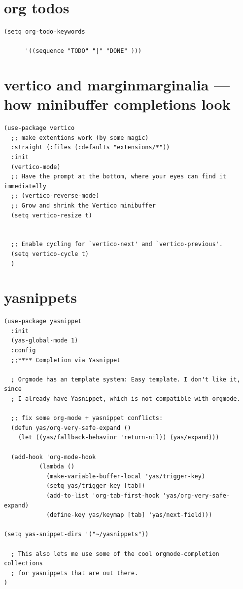 \documentclass[11pt]{article}
\begin{document}
\section{org todos}
\label{sec:org7424749}
\begin{verbatim}
(setq org-todo-keywords

      '((sequence "TODO" "|" "DONE" )))
\end{verbatim}
\section{vertico and marginmarginalia — how minibuffer completions look}
\label{sec:org92c891b}
\begin{verbatim}
(use-package vertico
  ;; make extentions work (by some magic)
  :straight (:files (:defaults "extensions/*"))
  :init
  (vertico-mode)
  ;; Have the prompt at the bottom, where your eyes can find it immediatelly
  ;; (vertico-reverse-mode)
  ;; Grow and shrink the Vertico minibuffer
  (setq vertico-resize t)


  ;; Enable cycling for `vertico-next' and `vertico-previous'.
  (setq vertico-cycle t)
  )
\end{verbatim}
\section{yasnippets}
\label{sec:org0c543bc}
\begin{verbatim}
(use-package yasnippet
  :init
  (yas-global-mode 1)
  :config
  ;;**** Completion via Yasnippet

  ; Orgmode has an template system: Easy template. I don't like it, since
  ; I already have Yasnippet, which is not compatible with orgmode.

  ;; fix some org-mode + yasnippet conflicts:
  (defun yas/org-very-safe-expand ()
    (let ((yas/fallback-behavior 'return-nil)) (yas/expand)))

  (add-hook 'org-mode-hook
          (lambda ()
            (make-variable-buffer-local 'yas/trigger-key)
            (setq yas/trigger-key [tab])
            (add-to-list 'org-tab-first-hook 'yas/org-very-safe-expand)
            (define-key yas/keymap [tab] 'yas/next-field)))

(setq yas-snippet-dirs '("~/yasnippets"))

  ; This also lets me use some of the cool orgmode-completion collections
  ; for yasnippets that are out there.
)
\end{verbatim}
\end{document}
